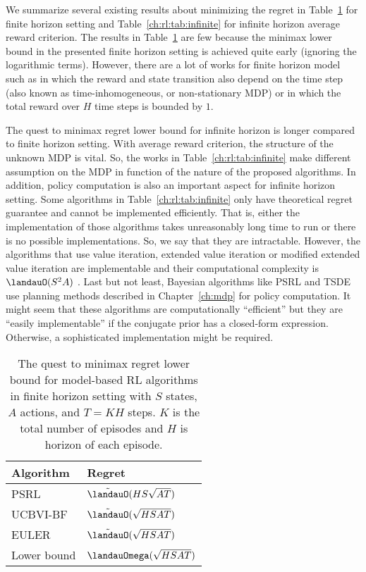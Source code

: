We summarize several existing results about minimizing the regret in Table~\ref{ch:rl:tab:finite} for finite horizon setting and Table~\ref{ch:rl:tab:infinite} for infinite horizon average reward criterion.
The results in Table~\ref{ch:rl:tab:finite} are few because the minimax lower bound in the presented finite horizon setting is achieved quite early (ignoring the logarithmic terms).
However, there are a lot of works for finite horizon model such as  \cite{jin2018q, domingues2021episodic, li2021breaking} in which the reward and state transition also depend on the time step (also known as time-inhomogeneous, or non-stationary MDP) or \cite{zanette2019tighter, zhang2021reinforcement} in which the total reward over $H$ time steps is bounded by $1$.

The quest to minimax regret lower bound for infinite horizon is longer compared to finite horizon setting.
With average reward criterion, the structure of the unknown MDP is vital.
So, the works in Table~\ref{ch:rl:tab:infinite} make different assumption on the MDP in function of the nature of the proposed algorithms.
In addition, policy computation is also an important aspect for infinite horizon setting.
Some algorithms in Table~\ref{ch:rl:tab:infinite} only have theoretical regret guarantee and cannot be implemented efficiently.
That is, either the implementation of those algorithms takes unreasonably long time to run or there is no possible implementations.
So, we say that they are intractable.
However, the algorithms that use value iteration, extended value iteration or modified extended value iteration are implementable and their computational complexity is $\landauO(S^2A)$ \cite{jaksch2010near}.
Last but not least, Bayesian algorithms like PSRL and TSDE use planning methods described in Chapter~\ref{ch:mdp} for policy computation.
It might seem that these algorithms are computationally ``efficient'' but they are ``easily implementable'' if the conjugate prior has a closed-form expression.
Otherwise, a sophisticated implementation might be required.

\begin{table}[ht]
    \centering
\begin{tabular}{|l|l|}
\hline
Algorithm & Regret \\ \hline
PSRL \cite{osband2013more}  & $\tilde{\landauO}(HS\sqrt{AT})$ \\ 
UCBVI-BF \cite{azar2017minimax}  & $\tilde{\landauO}(\sqrt{HSAT})$ \\ 
EULER \cite{zanette2019tighter}        & $\tilde{\landauO}(\sqrt{HSAT})$ \\ \hline
Lower bound & $\landauOmega(\sqrt{HSAT})$ \cite{jaksch2010near} \\ \hline
\end{tabular}
\caption{The quest to minimax regret lower bound for model-based RL algorithms in finite horizon setting with $S$ states, $A$ actions, and $T=KH$ steps.
$K$ is the total number of episodes and $H$ is horizon of each episode.
}
\label{ch:rl:tab:finite}
\end{table}

